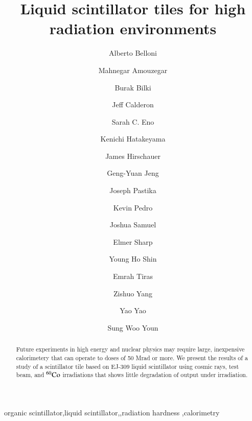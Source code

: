 \documentclass[review]{elsarticle}
\begin{document}
\begin{frontmatter}

\title{Liquid scintillator tiles for high radiation environments }


\author[umd]{Alberto Belloni}
\author[umd]{Mahnegar Amouzegar}
\author[iowa]{Burak Bilki}
\author[umd]{Jeff Calderon}
\author[umd]{Sarah C. Eno}
\author[baylor]{Kenichi Hatakeyama}
\author[fnal]{James Hirschauer}
\author[umd]{Geng-Yuan Jeng}
\author[baylor]{Joseph Pastika}
\author[fnal]{Kevin Pedro}
\author[umd]{Joshua Samuel}
\author[elmer]{Elmer Sharp}
\author[umd]{Young Ho Shin}
\author[baylor]{Emrah Tiras}
\author[umd]{Zishuo Yang}
\author[umd]{Yao Yao}
\author[korea]{Sung Woo Youn}




\address[umd]{Dept. Physics, U. Maryland, College Park MD 30742 USA}
\address[eljen]{Eljen Technology, 1300 W. Broadway, Sweetwater, Tx 79556 USA}
\address[korea]{Institute for Basic Science, Center for Axion and Precision Physics Research, IBS Center for Axion and Precision Physics Research
Room 4315, Department of Physics, Natural Science Building (E6-2), KAIST,
291 Daehak-ro, Yuseong-gu, Daejeon 305-701, South Korea}
\address[elmer]{Elmer Sharp Engineering, 7007 Leesville Blvd. Springfield, VA 22151}
\address[fnal]{Fermi National Accelerator Laboratory, Batavia, IL, USA}
\address[baylor]{Baylor University, Waco, Texas, USA}
\address[iowa]{The University of Iowa, Iowa City, IA, USA}

\begin{abstract}
Future experiments in high energy and nuclear physics may require large, inexpensive calorimetery that can operate to doses of 50 Mrad or more.
We present the results of a study of a scintillator tile based on EJ-309 liquid scintillator using cosmic rays, test beam, and $\rm{^{60}Co}$ irradiations
that shows little degradation of output under irradiation.
\end{abstract}

\begin{keyword}
organic scintillator\sep liquid scintillator\sep \sep radiation hardness \sep calorimetry
\end{keyword}

\end{frontmatter}

\linenumbers
\end{document}
